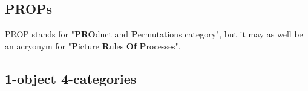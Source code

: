 \begin{defn}

\end{defn}

\begin{example}

\end{example}

\begin{defn}

\end{defn}

\begin{defn}

\end{defn}

\begin{theorem}[Strictification]

\end{theorem}

\begin{theorem}[Graphical?]

\end{theorem}

\subsection{PROPs}

PROP stands for "\textbf{PRO}duct and \textbf{P}ermutations category", but it may as well be an acryonym for "\textbf{P}icture \textbf{R}ules \textbf{Of} \textbf{P}rocesses".

\subsection{1-object 4-categories}

